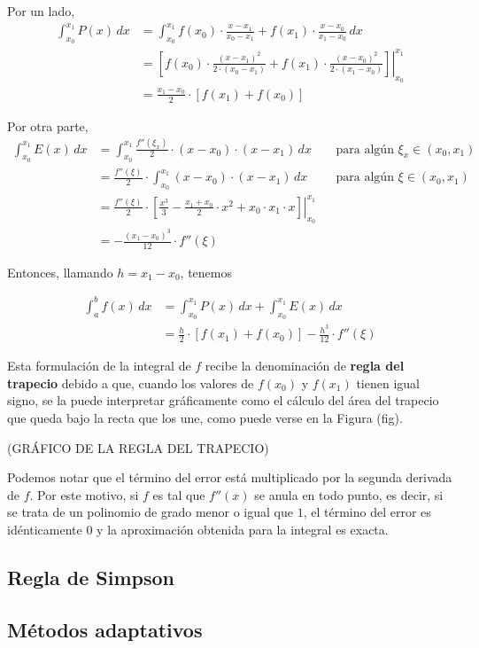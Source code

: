 Por un lado,
\[ \begin{aligned} \int_{x_0}^{x_1} P(x) \,dx
    &= \int_{x_0}^{x_1} f(x_0) \cdot \frac{x - x_1}{x_0 - x_1}
        + f(x_1) \cdot \frac{x - x_0}{x_1 - x_0} \,dx \\
    &= \left. \left[ f(x_0) \cdot \frac{(x - x_1)^2}{2 \cdot (x_0 - x_1)} + f(x_1) \cdot
        \frac{(x - x_0)^2}{2 \cdot (x_1 - x_0)} \right] \right\rvert_{x_0}^{x_1} \\
    &= \frac{x_1 - x_0}{2} \cdot \left[ f(x_1) + f(x_0) \right]
    \end{aligned} \]

Por otra parte,
\[ \begin{aligned} \int_{x_0}^{x_1} E(x) \,dx
    &= \int_{x_0}^{x_1} \frac{f''(\xi_x)}{2} \cdot (x-x_0) \cdot (x-x_1) \,dx
        && \text{para algún $\xi_x \in (x_0,x_1)$} \\
    &= \frac{f''(\xi)}{2} \cdot \int_{x_0}^{x_1} (x-x_0) \cdot (x-x_1) \,dx
        && \text{para algún $\xi \in (x_0,x_1)$} \\
    &= \frac{f''(\xi)}{2} \cdot \left. \left[ \frac{x^3}{3} - \frac{x_1 + x_0}{2}
        \cdot x^2 + x_0 \cdot x_1 \cdot x \right] \right\rvert_{x_0}^{x_1} \\
    &= - \frac{(x_1 - x_0)^3}{12} \cdot f''(\xi)
    \end{aligned} \]

Entonces, llamando $h = x_1 - x_0$, tenemos

\[ \begin{aligned} \int_a^b f(x) \,dx
    &= \int_{x_0}^{x_1} P(x) \,dx + \int_{x_0}^{x_1} E(x) \,dx \\
    &= \frac{h}{2} \cdot \left[ f(x_1) + f(x_0) \right] - \frac{h^3}{12} \cdot f''(\xi)
    \end{aligned} \]

Esta formulación de la integral de $f$ recibe la denominación de \textbf{regla del
trapecio} debido a que, cuando los valores de $f(x_0)$ y $f(x_1)$ tienen igual
signo, se la puede interpretar gráficamente como el cálculo del área del
trapecio que queda bajo la recta que los une, como puede verse en la
Figura (fig).

(GRÁFICO DE LA REGLA DEL TRAPECIO)

Podemos notar que el término del error está multiplicado por la segunda
derivada de $f$. Por este motivo, si $f$ es tal que $f''(x)$ se anula en todo
punto, es decir, si se trata de un polinomio de grado menor o igual que $1$,
el término del error es idénticamente $0$ y la aproximación obtenida para la
integral es exacta.

\subsection{Regla de Simpson}


\subsection{Métodos adaptativos}
